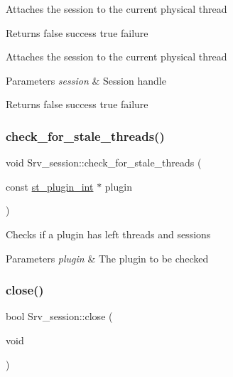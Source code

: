 Attaches the session to the current physical thread

\begin{DoxyReturn}{Returns}
false success true failure
\end{DoxyReturn}
Attaches the session to the current physical thread


\begin{DoxyParams}{Parameters}
{\em session} & Session handle\\
\hline
\end{DoxyParams}
\begin{DoxyReturn}{Returns}
false success true failure 
\end{DoxyReturn}
\mbox{\label{classSrv__session_a76d8a77081d966de8d6a662a3cefa605}} 
\subsubsection{\texorpdfstring{check\+\_\+for\+\_\+stale\+\_\+threads()}{check\_for\_stale\_threads()}}
{\footnotesize\ttfamily void Srv\+\_\+session\+::check\+\_\+for\+\_\+stale\+\_\+threads (\begin{DoxyParamCaption}\item[{const \mbox{\hyperlink{structst__plugin__int}{st\+\_\+plugin\+\_\+int}} $\ast$}]{plugin }\end{DoxyParamCaption})\hspace{0.3cm}{\ttfamily [static]}}

Checks if a plugin has left threads and sessions


\begin{DoxyParams}{Parameters}
{\em plugin} & The plugin to be checked \\
\hline
\end{DoxyParams}
\mbox{\label{classSrv__session_a4254885df510bcca1d1cdc88c9366028}} 
\subsubsection{\texorpdfstring{close()}{close()}}
{\footnotesize\ttfamily bool Srv\+\_\+session\+::close (\begin{DoxyParamCaption}\item[{void}]{ }\end{DoxyParamCaption})}

